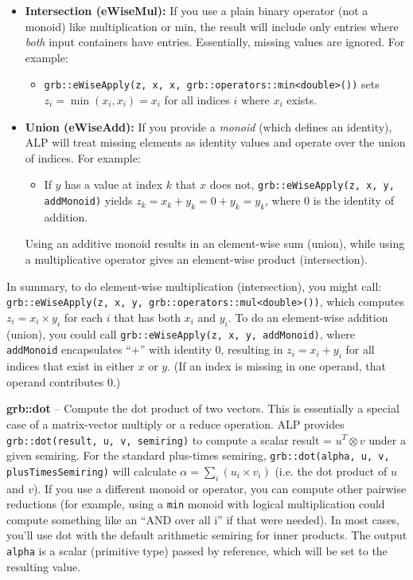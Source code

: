 \begin{itemize}
  \item \textbf{Intersection (eWiseMul):} If you use a plain binary operator (not a monoid) like multiplication or min, the result will include only entries where \emph{both} input containers have entries. Essentially, missing values are ignored. For example:
  \begin{itemize}
    \item \texttt{grb::eWiseApply(z, x, x, grb::operators::min<double>())} sets $z_i = \min(x_i, x_i) = x_i$ for all indices $i$ where $x_i$ exists.
  \end{itemize}

  \item \textbf{Union (eWiseAdd):} If you provide a \emph{monoid} (which defines an identity), ALP will treat missing elements as identity values and operate over the union of indices. For example:
  \begin{itemize}
    \item If $y$ has a value at index $k$ that $x$ does not, \texttt{grb::eWiseApply(z, x, y, addMonoid)} yields $z_k = x_k + y_k = 0 + y_k = y_k$, where 0 is the identity of addition.
  \end{itemize}
  Using an additive monoid results in an element-wise sum (union), while using a multiplicative operator gives an element-wise product (intersection).
\end{itemize}

    In summary, to do element-wise multiplication (intersection), you might call:
    \texttt{grb::eWiseApply(z, x, y, grb::operators::mul<double>())},
    which computes $z_i = x_i \times y_i$ for each $i$ that has both $x_i$ and $y_i$. To do an element-wise addition (union), you could call
    \texttt{grb::eWiseApply(z, x, y, addMonoid)}, where \texttt{addMonoid} encapsulates “+” with identity 0, resulting in $z_i = x_i + y_i$ for all indices that exist in either $x$ or $y$. (If an index is missing in one operand, that operand contributes 0.)
\newline

      \textbf{grb::dot} – Compute the dot product of two vectors. This is essentially a special case of a matrix-vector multiply or a reduce operation. ALP provides \texttt{grb::dot(result, u, v, semiring)} to compute a scalar result = $u^T \otimes v$ under a given semiring. For the standard plus-times semiring, \texttt{grb::dot(alpha, u, v, plusTimesSemiring)} will calculate $\alpha = \sum_i (u_i \times v_i)$ (i.e. the dot product of $u$ and $v$). If you use a different monoid or operator, you can compute other pairwise reductions (for example, using a \texttt{min} monoid with logical multiplication could compute something like an “AND over all i” if that were needed). In most cases, you'll use dot with the default arithmetic semiring for inner products. The output \texttt{alpha} is a scalar (primitive type) passed by reference, which will be set to the resulting value.
\newline

